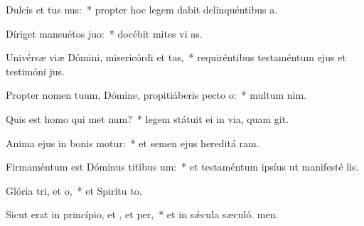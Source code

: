 \item Dulcis et tus nus:~* propter hoc legem dabit delinquéntibus  a.
\item Díriget mansuétos  juo:~* docébit mites vi as.
\item Univérsæ viæ Dómini, misericórdi et tas,~* requiréntibus testaméntum ejus et testimóni jus.
\item Propter nomen tuum, Dómine, propitiáberis pecto o:~* multum  nim.
\item Quis est homo qui met num?~* legem státuit ei in via, quam git.
\item Anima ejus in bonis motur:~* et semen ejus hereditá ram.
\item Firmaméntum est Dóminus titibus um:~* et testaméntum ipsíus ut manifesté lis.
\item Glória tri, et o,~* et Spirítu to.
\item Sicut erat in princípio, et , et per,~* et in sǽcula sæculó. men.
